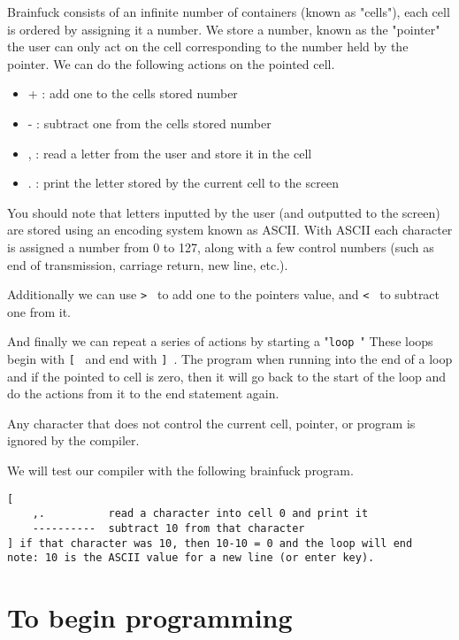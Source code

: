 \documentclass[12pt]{article}
\begin{document}
Brainfuck consists of an infinite number of containers
(known as "cells"), each cell is ordered by assigning
it a number. We store a number, known as the "pointer"
the user can only act on the cell corresponding to the
number held by the pointer. We can do the following
actions on the pointed cell.

\begin{itemize}
    \item{+ : add one to the cells stored number}
    \item{- : subtract one from the cells stored number}
    \item{, : read a letter from the user and store it in
        the cell}
    \item{. : print the letter stored by the current cell
        to the screen}
\end{itemize}

You should note that letters inputted by the user (and
outputted to the screen) are stored using an encoding
system known as ASCII. With ASCII each character
is assigned a number from 0 to 127, along with a few
control numbers (such as end of transmission, carriage
return, new line, etc.).

Additionally we can use {\tt > } to add one to the pointers
value, and {\tt < } to subtract one from it.

And finally we can repeat a series of actions by starting
a "{\tt loop }" These loops begin with {\tt [ } and end with
{\tt ] }. The program when running into the end of a loop
and if the pointed to cell is zero, then it will go back
to the start of the loop and do the actions from it to the
end statement again.

Any character that does not control the current cell,
pointer, or program is ignored by the compiler.

We will test our compiler with the following brainfuck
program.

\begin{verbatim}
[
    ,.          read a character into cell 0 and print it
    ----------  subtract 10 from that character
] if that character was 10, then 10-10 = 0 and the loop will end
note: 10 is the ASCII value for a new line (or enter key).
\end{verbatim}

\section{To begin programming}
\end{document}
